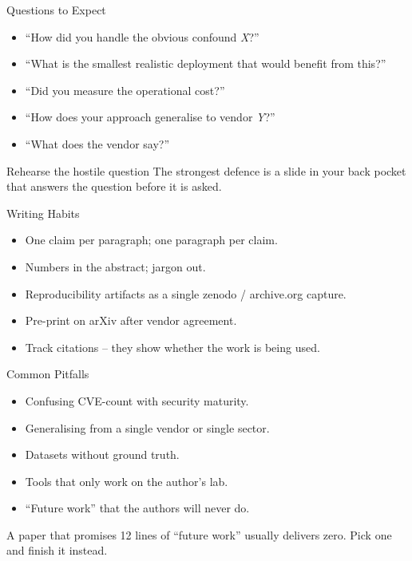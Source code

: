 \documentclass[aspectratio=169,11pt]{beamer}
\begin{document}
\begin{frame}{Questions to Expect}
\begin{itemize}
  \item ``How did you handle the obvious confound \emph{X}?''
  \item ``What is the smallest realistic deployment that would benefit from this?''
  \item ``Did you measure the operational cost?''
  \item ``How does your approach generalise to vendor \emph{Y}?''
  \item ``What does the vendor say?''
\end{itemize}
\begin{tipbox}{Rehearse the hostile question}
The strongest defence is a slide in your back pocket that answers the question before it is asked.
\end{tipbox}
\end{frame}

\begin{frame}{Writing Habits}
\begin{itemize}
  \item One claim per paragraph; one paragraph per claim.
  \item Numbers in the abstract; jargon out.
  \item Reproducibility artifacts as a single zenodo / archive.org capture.
  \item Pre-print on arXiv after vendor agreement.
  \item Track citations -- they show whether the work is being used.
\end{itemize}
\end{frame}

\begin{frame}{Common Pitfalls}
\begin{itemize}
  \item Confusing CVE-count with security maturity.
  \item Generalising from a single vendor or single sector.
  \item Datasets without ground truth.
  \item Tools that only work on the author's lab.
  \item ``Future work'' that the authors will never do.
\end{itemize}
\begin{warnbox}
A paper that promises 12 lines of ``future work'' usually delivers zero. Pick one and finish it instead.
\end{warnbox}
\end{frame}
\end{document}
